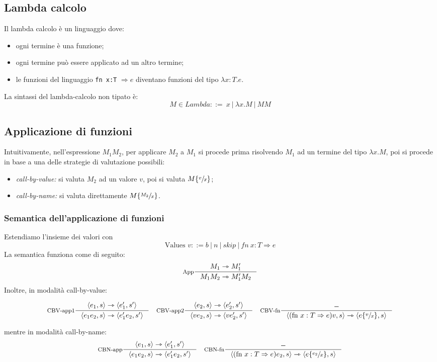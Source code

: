 \documentclass[a4paper, 11pt]{article}
\newcommand{\subs}[3]{#1 \lbrace \sfrac{#2}{#3} \rbrace}
\begin{document}
\subsection{Lambda calcolo}
Il lambda calcolo è un linguaggio dove: \begin{itemize}
	\item ogni termine è una funzione;
	\item ogni termine può essere applicato ad un altro termine;
	\item le funzioni del linguaggio \lstinline|fn x:T| $\Rightarrow e$ diventano funzioni del tipo $\lambda x:T.e$.
\end{itemize}

La sintassi del lambda-calcolo non tipato è: \[ M \in Lambda ::=\ x\ |\ \lambda x.M\ |\ MM \]

\subsection{Applicazione di funzioni}
Intuitivamente, nell'espressione $M_1M_2$, per applicare $M_2$ a $M_1$ si procede prima risolvendo $M_1$ ad un termine del tipo $\lambda x.M$, poi si procede in base a una delle strategie di valutazione possibili: \begin{itemize}
\item \textit{call-by-value:} si valuta $M_2$ ad un valore $v$, poi si valuta $\subs{M}{v}{x}$;
\item \textit{call-by-name:} si valuta direttamente $\subs{M}{M_2}{x}$.
\end{itemize}

\subsubsection{Semantica dell'applicazione di funzioni}
Estendiamo l'insieme dei valori con \[ \text{Values } v::= b\ |\ n\ |\ skip\ |\ fn\ x:T \Rightarrow e \]
La semantica funziona come di seguito:
\[ \inference[App]{M_1 \rightarrowtriangle M_1'}{M_1M_2 \rightarrowtriangle M_1'M_2} \]
Inoltre, in modalità call-by-value: \begin{adjustwidth}{-1.3cm}{}
\begin{align*}
	\inference[CBV-app1]{\langle e_1, s \rangle \rightarrowtriangle \langle e_1', s' \rangle}{\langle e_1e_2,s \rangle \rightarrowtriangle \langle e_1'e_2, s' \rangle}\quad  \inference[CBV-app2]{\langle e_2,s \rangle \rightarrowtriangle \langle e_2',s' \rangle}{\langle ve_2,s \rangle \rightarrowtriangle \langle ve_2',s' \rangle} \quad
	\inference[CBV-fn]{-}{\langle (\text{fn }x:T \Rightarrow e)v, s \rangle \rightarrowtriangle \langle \subs{e}{v}{x},s \rangle}
\end{align*}
\end{adjustwidth}
mentre in modalità call-by-name: \begin{align*}
\inference[CBN-app]{\langle e_1, s \rangle \rightarrowtriangle \langle e_1', s' \rangle}{\langle e_1e_2,s \rangle \rightarrowtriangle \langle e_1'e_2, s' \rangle} \quad \inference[CBN-fn]{-}{\langle (\text{fn }x:T \Rightarrow e)e_2, s \rangle \rightarrowtriangle \langle \subs{e}{e_2}{x},s \rangle}
\end{align*}
\end{document}
